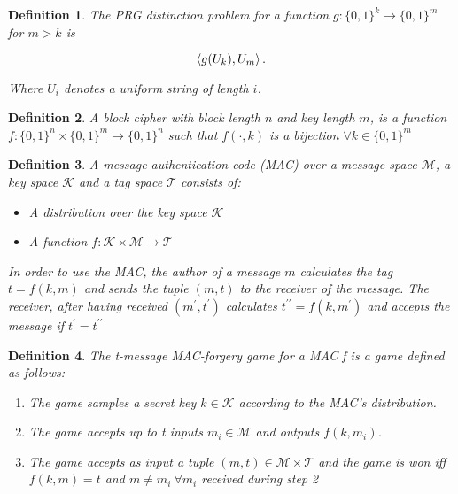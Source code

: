 \documentclass[a4paper,german]{article}
\newtheorem{definition}{Definition}
\begin{document}
\begin{definition}
	The PRG distinction problem for a function $g: \{0, 1\}^k \rightarrow \{0, 1\}^m$ for $m > k$ is 

	\[
		\braket{g(U_k), U_m}
	.\] 

	Where $U_i$ denotes a uniform string of length $i$.
\end{definition}

\begin{definition}
	A block cipher with block length $n$ and key length $m$, is a function $f: \{0,1\}^n \times \{0,1\}^m \rightarrow \{0,1\}^n$ such that $f(\cdot, k)$ is a bijection $\forall k \in \{0,1\}^m$
\end{definition}

\begin{definition}
	A message authentication code (MAC) over a message space $\mathcal{M}$, a key space $\mathcal{K}$ and a tag space $\mathcal{T}$ consists of:

	\begin{itemize}
	
		\item  A distribution over the key space $\mathcal{K}$ 
		\item  A function $f: \mathcal{K} \times \mathcal{M} \rightarrow \mathcal{T}$ 
	\end{itemize}

In order to use the MAC, the author of a message $m$ calculates the tag $t = f(k,m)$ and sends the tuple $(m, t)$ to the receiver of the message. The receiver, after having received $(m^\prime, t^\prime)$ calculates $t^{\prime\prime} = f(k, m^\prime)$ and accepts the message if $t^\prime = t^{\prime\prime}$
\end{definition}

\begin{definition}
	The t-message MAC-forgery game for a MAC f is a game defined as follows:

	\begin{enumerate}
	
		\item  The game samples a secret key $k \in \mathcal{K}$ according to the MAC's distribution.
		\item  The game accepts up to t inputs $m_i \in \mathcal{M}$ and outputs $f(k, m_i)$.
		\item  The game accepts as input a tuple $(m, t) \in \mathcal{M \times T}$ and the game is won iff  $f(k, m) = t$ and $m \neq m_i ~ \forall m_i$ received during step 2
	
	\end{enumerate}
\end{definition}
\end{document}
